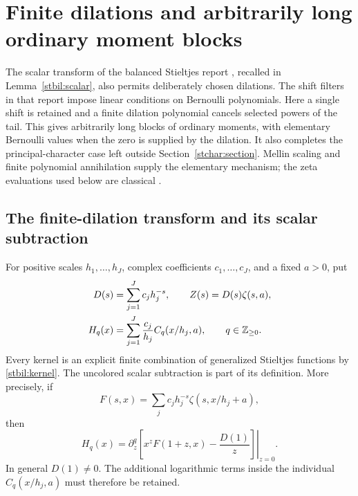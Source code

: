 \section{Finite dilations and arbitrarily long ordinary moment blocks}
\label{stdil:section}

The scalar transform of the balanced Stieltjes report
\cite{stmell:balanced}, recalled in Lemma~\ref{stbil:scalar}, also permits
deliberately chosen dilations. The shift filters in that report impose
linear conditions on Bernoulli polynomials. Here a single shift is retained
and a finite dilation polynomial cancels selected powers of the tail.
This gives arbitrarily long blocks of ordinary moments, with elementary
Bernoulli values when the zero is supplied by the dilation. It also
completes the principal-character case left outside
Section~\ref{stchar:section}. Mellin scaling and finite polynomial
annihilation supply the elementary mechanism; the zeta evaluations
used below are classical \cite{stchar:classical}.

\subsection{The finite-dilation transform and its scalar subtraction}

For positive scales $h_1,\ldots,h_J$, complex coefficients
$c_1,\ldots,c_J$, and a fixed $a>0$, put
\begin{align}
 D(s)&=\sum_{j=1}^Jc_jh_j^{-s},\qquad
 Z(s)=D(s)\zeta(s,a),\notag\\
 H_q(x)&=\sum_{j=1}^J\frac{c_j}{h_j}C_q(x/h_j,a),
 \qquad q\in\mathbb Z_{\ge0}.\label{stdil:kernel}
\end{align}
Every kernel is an explicit finite combination of generalized Stieltjes
functions by \eqref{stbil:kernel}. The uncolored scalar subtraction is
part of its definition. More precisely, if
\[
 F(s,x)=\sum_jc_jh_j^{-s}\zeta(s,x/h_j+a),
\]
then
\begin{equation}\label{stdil:subtraction}
 H_q(x)=\left.\partial_z^q
       \left[x^zF(1+z,x)-\frac{D(1)}z\right]\right|_{z=0}.
\end{equation}
In general $D(1)\ne0$. The additional logarithmic terms inside the
individual $C_q(x/h_j,a)$ must therefore be retained.

